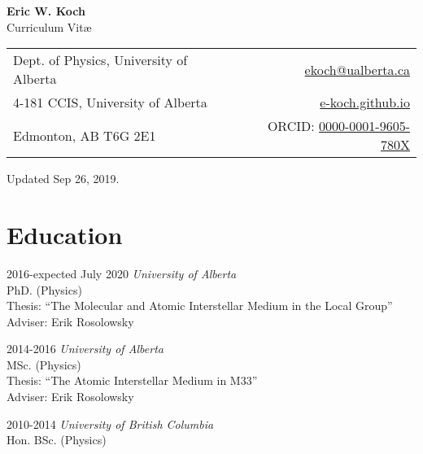 \documentclass[letterpaper,11pt]{article}
\makeatletter
\newcommand{\myname}{Eric W. Koch}
\newcommand{\myaffil}{Dept. of Physics, University of Alberta}
\newcommand{\myemail}{ekoch@ualberta.ca}
\newcommand{\mypostlineone}{4-181 CCIS, University of Alberta}
\newcommand{\mypostlinetwo}{Edmonton, AB T6G 2E1}
\newcommand{\mysite}{e-koch.github.io}
\newcommand{\myorcid}{https://orcid.org/0000-0001-9605-780X}
\newlength{\mainindent} \setlength{\mainindent}{12pt}
\newlength{\contentindent} \setlength{\contentindent}{19ex}
\newenvironment{datelist}{
  \begingroup
  \raggedright
  \begin{description}[labelindent=\mainindent,leftmargin=\contentindent,
      style=sameline,font=\normalfont,topsep=0pt,partopsep=0pt,parsep=0pt,
      itemsep=4pt]
}{
  \end{description}
  \endgroup
}
\makeatother
\begin{document}
\pagestyle{fancy}
\lhead{} \chead{} \rhead{} \renewcommand{\headrule}{\relax}
\cfoot{\thepage/\pageref*{LastPage}}
\rfoot{\textsc{\myname}}

\begin{center}
\textbf{\Large \myname} \\
{\large Curriculum Vit\ae}
\end{center}

\medskip

\begin{tabular*}{\textwidth}{@{\extracolsep{\fill}}lr}
\myaffil &
 \textsf{\href{mailto:\myemail}{\myemail}} \\
\mypostlineone &
 \url{\mysite} \\
\mypostlinetwo &
  \textsf{ORCID: \href{\myorcid}{0000-0001-9605-780X}} \\
\end{tabular*}

\medskip


Updated %
Sep 26, 2019.

\section*{Education}
\begin{datelist}
\item[2016-expected July 2020]
  \emph{University of Alberta} \\
  PhD. (Physics) \\
  Thesis: {``The Molecular and Atomic Interstellar Medium in the Local Group''} \\
  Adviser: Erik Rosolowsky
\item[2014-2016]
  \emph{University of Alberta} \\
  MSc. (Physics) \\
  Thesis: {``The Atomic Interstellar Medium in M33''} \\
  Adviser: Erik Rosolowsky
\item[2010-2014]
  \emph{University of British Columbia} \\
  Hon. BSc. (Physics)
\end{datelist}
\end{document}
